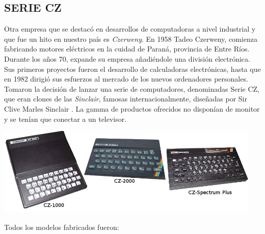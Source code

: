 \documentclass[%
  	final,
%
	notitlepage,
	narroweqnarray,
	inline,
 	twoside,
	]{ieee}
\begin{document}
\subsection*{SERIE CZ}

Otra empresa que se destac\'o en desarrollos de computadoras a nivel industrial y que fue un hito en nuestro pa\'is es \textit{Czerweny}. En 1958 Tadeo Czerweny, comienza fabricando motores el\'ectricos en la cuidad de Paran\'a, provincia de Entre R\'ios. Durante los a\~nos 70, expande su empresa a\~nadi\'endole una divisi\'on electr\'onica. Sus primeros proyectos fueron el desarrollo de calculadoras electr\'onicas, hasta que en 1982 dirigi\'o sus esfuerzos al mercado de los nuevos ordenadores personales. Tomaron la decisi\'on de lanzar una serie de computadores, denominadas Serie CZ, que eran clones de las \textit{Sinclair}, famosas internacionalmente, dise\~nadas por Sir Clive Marles Sinclair \cite{sinclair}.
La gamma de productos ofrecidos no dispon\'ian de monitor y se ten\'ian que conectar a un televisor.\\  

\begin{center}\includegraphics[width=360pt, height=120pt]{serieCZ.png}\end{center}
Todos los modelos fabricados fueron:\\
\end{document}
